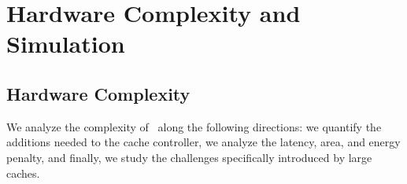 
%
%

\chapter{Hardware Complexity and Simulation}
\label{chap:hardware_complexity_and_simulation}


\section{Hardware Complexity}  
\label{sec:hardware_complexity}
We analyze the complexity of \AC\ along the following directions: we quantify the additions needed to the cache controller, we analyze the latency, area, and energy penalty, and finally, we study the challenges specifically introduced by large caches.


